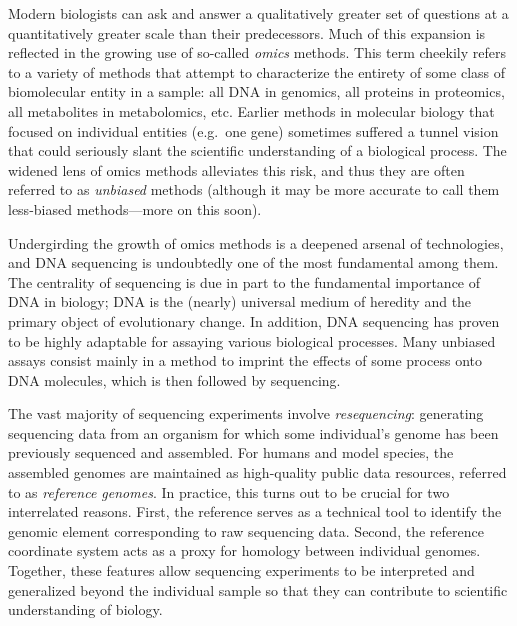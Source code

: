 \documentclass[11pt]{ucthesis}
\begin{document}
\label{chapter:intro}


Modern biologists can ask and answer a qualitatively greater set of questions at a quantitatively greater scale than their predecessors. Much of this expansion is reflected in the growing use of so-called \emph{omics} methods. This term cheekily refers to a variety of methods that attempt to characterize the entirety of some class of biomolecular entity in a sample: all DNA in genomics, all proteins in proteomics, all metabolites in metabolomics, etc. Earlier methods in molecular biology that focused on individual entities (e.g.\ one gene) sometimes suffered a tunnel vision that could seriously slant the scientific understanding of a biological process. The widened lens of omics methods alleviates this risk, and thus they are often referred to as \emph{unbiased} methods (although it may be more accurate to call them less-biased methods---more on this soon).

Undergirding the growth of omics methods is a deepened arsenal of technologies, and DNA sequencing is undoubtedly one of the most fundamental among them. The centrality of sequencing is due in part to the fundamental importance of DNA in biology; DNA is the (nearly) universal medium of heredity and the primary object of evolutionary change. In addition, DNA sequencing has proven to be highly adaptable for assaying various biological processes. Many unbiased assays consist mainly in a method to imprint the effects of some process onto DNA molecules, which is then followed by sequencing. 

The vast majority of sequencing experiments involve \emph{resequencing}: generating sequencing data from an organism for which some individual's genome has been previously sequenced and assembled. For humans and model species, the assembled genomes are maintained as high-quality public data resources, referred to as \emph{reference genomes}. In practice, this turns out to be crucial for two interrelated reasons. First, the reference serves as a technical tool to identify the genomic element corresponding to raw sequencing data. Second, the reference coordinate system acts as a proxy for homology between individual genomes. Together, these features allow sequencing experiments to be interpreted and generalized beyond the individual sample so that they can contribute to scientific understanding of biology.
\end{document}
